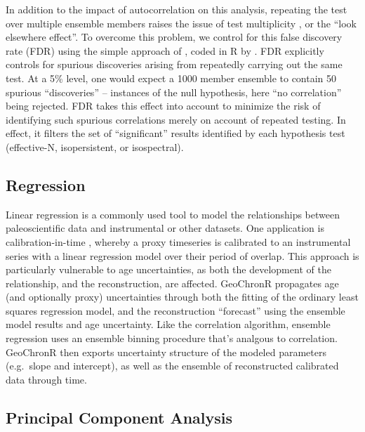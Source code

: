 \documentclass[gchron, manuscript]{copernicus}
\begin{document}
In addition to the impact of autocorrelation on this analysis, repeating the test over multiple ensemble members raises the issue of test multiplicity \citep{Ventura2004}, or the ``look elsewhere effect''.
To overcome this problem, we control for this false discovery rate (FDR) using the simple approach of \citet{BenjaminiHochberg95}, coded in R by \citet{Ventura2004}.
FDR explicitly controls for spurious discoveries arising from repeatedly carrying out the same test.
At a 5\% level, one would expect a 1000 member ensemble to contain 50 spurious ``discoveries'' -- instances of the null hypothesis, here ``no correlation'' being rejected.
FDR takes this effect into account to minimize the risk of identifying such spurious correlations merely on account of repeated testing.
In effect, it filters the set of ``significant'' results identified by each hypothesis test (effective-N, isopersistent, or isospectral).

\subsection{Regression}

Linear regression is a commonly used tool to model the relationships between paleoscientific data and instrumental or other datasets.
One application is calibration-in-time \citep{grosjean2009calibration}, whereby a proxy timeseries is calibrated to an instrumental series with a linear regression model over their period of overlap.
This approach is particularly vulnerable to age uncertainties, as both the development of the relationship, and the reconstruction, are affected.
GeoChronR propagates age (and optionally proxy) uncertainties through both the fitting of the ordinary least squares regression model, and the reconstruction ``forecast'' using the ensemble model results and age uncertainty.
Like the correlation algorithm, ensemble regression uses an ensemble binning procedure that's analgous to correlation.
GeoChronR then exports uncertainty structure of the modeled parameters (e.g.~slope and intercept), as well as the ensemble of reconstructed calibrated data through time.

\subsection{Principal Component Analysis}
\end{document}
